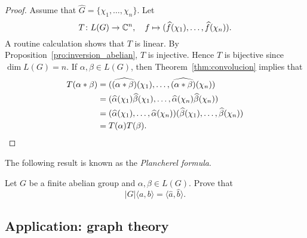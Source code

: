\begin{proof}
  Assume that $\widehat{G}=\{\chi_1,\dots,\chi_n\}$. 
  Let 
  \[
  T\colon L(G)\to\mathbb{C}^n,
  \quad
  f\mapsto(\widehat{f}(\chi_1),\dots,\widehat{f}(\chi_n)).
  \]
  A routine calculation shows that $T$ is linear. By 
  Proposition~\ref{pro:inversion_abelian}, 
  $T$ is injective. Hence $T$ is bijective since
  $\dim L(G)=n$. If $\alpha,\beta\in L(G)$, then Theorem~\ref{thm:convolucion} implies that 
  \begin{align*}
    T(\alpha*\beta)&=(\widehat{(\alpha*\beta)}(\chi_1),\dots,\widehat{(\alpha*\beta)}(\chi_n))\\
    &=(\widehat{\alpha}(\chi_1)\widehat{\beta}(\chi_1),\dots,\widehat{\alpha}(\chi_n)\widehat{\beta}(\chi_n))\\
    &=(\widehat{\alpha}(\chi_1),\dots,\widehat{\alpha}(\chi_n))(\widehat{\beta}(\chi_1),\dots,\widehat{\beta}(\chi_n))\\
    &=T(\alpha)T(\beta).\qedhere 
  \end{align*}
\end{proof}

The following result is known as the \emph{Plancherel formula}.

\begin{exercise}
  Let $G$ be a finite abelian group and $\alpha,\beta\in L(G)$. Prove that  \[
  |G|\langle a,b\rangle=\langle\widehat{a},\widehat{b}\rangle.
  \]
\end{exercise}


\subsection{Application: graph theory}

